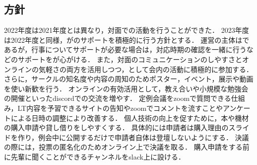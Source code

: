\subsection*{\newGradeIfKouki{}\thirdGrade{}方針}


2022年度は2021年度とは異なり，対面での活動を行うことができた．
2023年度は2022年度と同様，\newGradeIfKouki{}\thirdGrade{}が\newGradeIfKouki{}\secondGrade{}のサポートを積極的に行う方針とする．
運営の主体は\newGradeIfKouki{}\secondGrade{}であるが，行事についてサポートが必要な場合は，対応時期の確認を一緒に行うなどのサポートを\newGradeIfKouki{}\thirdGrade{}が心がける．
また，対面のコミュニケーションのしやすさとオンラインの気軽さの両方を活用しつつ，\newGradeIfKouki{}\thirdGrade{}として会内の活動に積極的に参加する．
さらに，サークルの知名度や内容の周知のためポスター，イベント，展示や動画を使い新歓を行う．
オンラインの有効活用として，教え合いや小規模な勉強会の開催といったdiscordでの交流を増やす．
定例会議をzoomで質問できる仕組み，LT内容を予習できるサイトの告知やzoomでコメントを流すことやアンケートによる日時の調整により改善する．
個人技術の向上を促すために，本や機材の購入申請や貸し借りをしやすくする．
具体的には申請者は購入理由のスライドを作り，例会中に公開するだけで申請者自体は登壇しないようにする．
決議の際には，投票の匿名化のためオンライン上で決議を取る．
購入申請をする前に先輩に聞くことができるチャンネルをslack上に設ける．